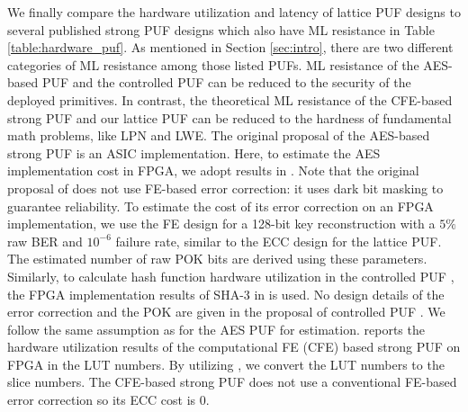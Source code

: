 We finally compare the hardware utilization and latency of lattice PUF designs to several published strong PUF designs \cite{bhargava2014efficient, gassend2008controlled, jin2017fpga} which also have ML resistance in Table \ref{table:hardware_puf}. 
As mentioned in Section \ref{sec:intro}, there are two different categories of ML resistance among those listed PUFs. 
ML resistance of the AES-based PUF and the controlled PUF can be reduced to the security of the deployed primitives. 
In contrast, the theoretical ML resistance of the CFE-based strong PUF and our lattice PUF can be reduced to the hardness of fundamental math problems, like LPN and LWE.
The original proposal of the AES-based strong PUF \cite{bhargava2014efficient} is an ASIC implementation. 
Here, to estimate the AES implementation cost in FPGA, we adopt results in \cite{chu2012low}.
Note that the original proposal of \cite{bhargava2014efficient} does not use FE-based error correction: it uses dark bit masking to guarantee reliability. 
To estimate the cost of its error correction on an FPGA implementation, we use the FE design for a 128-bit key reconstruction with a $5\%$ raw BER and $10^{-6}$ failure rate, similar to the ECC design for the lattice PUF. The estimated number of raw POK bits are derived using these parameters.
Similarly, to calculate hash function hardware utilization in the controlled PUF \cite{gassend2008controlled}, the FPGA implementation results of SHA-3 in \cite{sha3_finalist} is used. 
No design details of the error correction and the POK are given in the proposal of controlled PUF \cite{gassend2008controlled}. We follow the same assumption as for the AES PUF for estimation.
\cite{jin2017fpga} reports the hardware utilization results of the computational FE (CFE) based strong PUF on FPGA in the LUT numbers.
By utilizing \cite{xilinx:ds190}, we convert the LUT numbers to the slice numbers. 
The CFE-based strong PUF does not use a conventional FE-based error correction so its ECC cost is 0.

